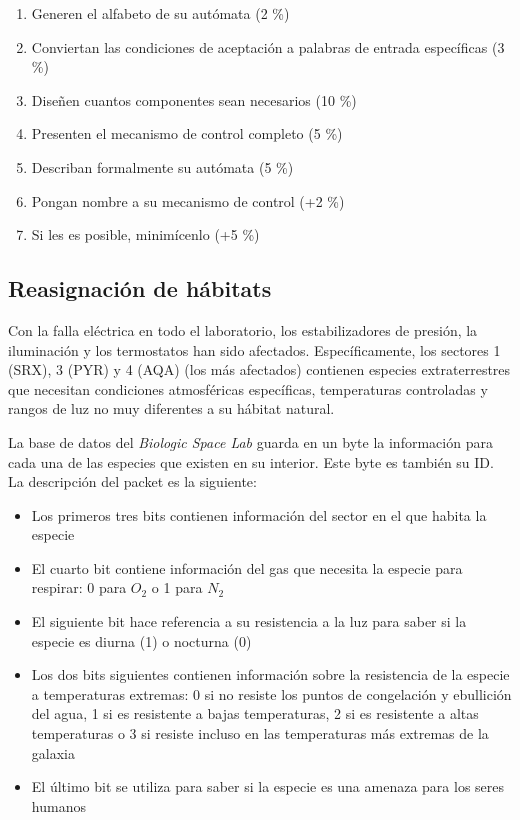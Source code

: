 \documentclass[8pt, onside]{article}
\begin{document}
\begin{enumerate}[label=\tt \alph*)]
    \itemsep0em
    \item Generen el alfabeto de su autómata (2 \%)
    \item Conviertan las condiciones de aceptación a palabras de entrada específicas (3 \%)
    \item Diseñen cuantos componentes sean necesarios (10 \%)
    \item Presenten el mecanismo de control completo (5 \%)
    \item Describan formalmente su autómata (5 \%)
    \item Pongan nombre a su mecanismo de control (+2 \%)
    \item Si les es posible, minimícenlo (+5 \%)
\end{enumerate}

\subsection*{Reasignación de hábitats}

Con la falla eléctrica en todo el laboratorio, los estabilizadores de presión, la iluminación y los termostatos han sido afectados.
Específicamente, los sectores 1 (SRX), 3 (PYR) y 4 (AQA) (los más afectados) contienen especies extraterrestres que necesitan condiciones atmosféricas específicas, temperaturas controladas y rangos de luz no muy diferentes a su hábitat natural.

La base de datos del \textit{Biologic Space Lab} guarda en un byte la información para cada una de las especies que existen en su interior.
Este byte es también su ID.
La descripción del packet es la siguiente:

\begin{itemize}
    \itemsep0em
    \item Los primeros tres bits contienen información del sector en el que habita la especie
    \item El cuarto bit contiene información del gas que necesita la especie para respirar: 0 para ${O_2}$ o 1 para $N_2$
    \item El siguiente bit hace referencia a su resistencia a la luz para saber si la especie es diurna (1) o nocturna (0)
    \item Los dos bits siguientes contienen información sobre la resistencia de la especie a temperaturas extremas: 0 si no resiste los puntos de congelación y ebullición del agua, 1 si es resistente a bajas temperaturas, 2 si es resistente a altas temperaturas o 3 si resiste incluso en las temperaturas más extremas de la galaxia
    \item El último bit se utiliza para saber si la especie es una amenaza para los seres humanos
\end{itemize}
\end{document}
